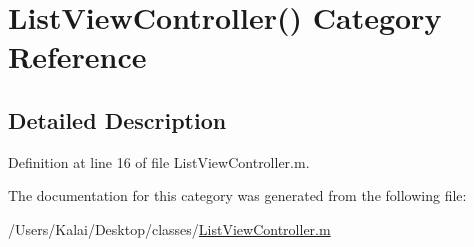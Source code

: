 \hypertarget{category_list_view_controller_07_08}{\section{List\-View\-Controller() Category Reference}
\label{category_list_view_controller_07_08}
}


\subsection{Detailed Description}


Definition at line 16 of file List\-View\-Controller.\-m.



The documentation for this category was generated from the following file\-:\begin{DoxyCompactItemize}
\item 
/\-Users/\-Kalai/\-Desktop/classes/\hyperlink{_list_view_controller_8m}{List\-View\-Controller.\-m}\end{DoxyCompactItemize}

